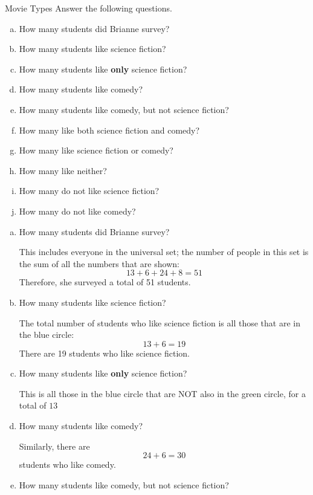 \begin{example}[https://www.youtube.com/watch?v=Nkay8g-5suM&list=PLfmpjsIzhztuvrh-T2Owgo_gO84qypSBG&index=21]{Movie Types}
Answer the following questions.
\begin{enumerate}[(a)]
\item How many students did Brianne survey?
\item How many students like science fiction?
\item How many students like \textbf{only} science fiction?
\item How many students like comedy?
\item How many students like comedy, but not science fiction?
\item How many like both science fiction and comedy?
\item How many like science fiction or comedy?
\item How many like neither?
\item How many do not like science fiction?
\item How many do not like comedy?
\end{enumerate}

\sol
\begin{enumerate}[(a)]
\item How many students did Brianne survey?

This includes everyone in the universal set; the number of people in this set is the sum of all the numbers that are shown:
\[13+6+24+8 = \boxed{51}\]
Therefore, she surveyed a total of 51 students.\\

\item How many students like science fiction?

The total number of students who like science fiction is all those that are in the blue circle:
\[13+6 = \boxed{19}\]
There are 19 students who like science fiction.\\

\item How many students like \textbf{only} science fiction?

This is all those in the blue circle that are NOT also in the green circle, for a total of $\boxed{13}$\\

\item How many students like comedy?

Similarly, there are \[24+6 = \boxed{30}\] students who like comedy.\\

\item How many students like comedy, but not science fiction?


\end{enumerate}
\end{example}
